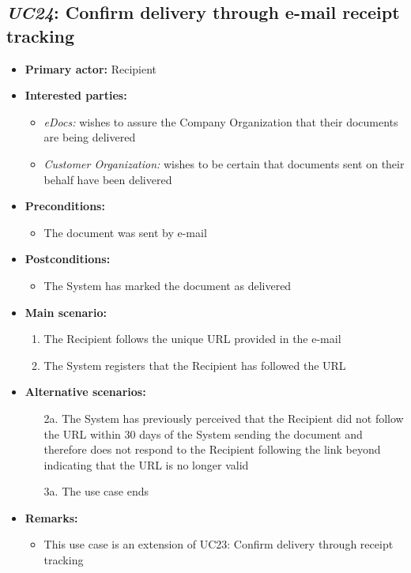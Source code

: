 \documentclass[a4paper,10pt]{article}
\begin{document}
\subsection{\emph{UC24}: Confirm delivery through e-mail receipt tracking}
\begin{itemize}
	\item \textbf{Primary actor:} Recipient
	\item \textbf{Interested parties:} 
	\begin{itemize}
		\item \textit{eDocs:} wishes to assure the Company Organization that their documents are being delivered
		\item \textit{Customer Organization:} wishes to be certain that documents sent on their behalf have been delivered
	\end{itemize}
	
	\item \textbf{Preconditions:}
	\begin{itemize}
		\item The document was sent by e-mail
	\end{itemize}
	
	\item \textbf{Postconditions:}
	\begin{itemize}
		\item The System has marked the document as delivered
	\end{itemize}
	
	\item \textbf{Main scenario:} 
	\begin{enumerate}
		\item The Recipient follows the unique URL provided in the e-mail
		\item The System registers that the Recipient has followed the URL
	\end{enumerate}
	
	\item \textbf{Alternative scenarios:} 
	\begin{enumerate}
		\item [2a.] The System has previously perceived that the Recipient did not follow the URL within 30 days of the System sending the document and therefore does not respond to the Recipient following the link beyond indicating that the URL is no longer valid
		\item [3a.] The use case ends
	\end{enumerate}
	
	\item \textbf{Remarks:}
	\begin{itemize}
		\item This use case is an extension of UC23: Confirm delivery through receipt tracking
	\end{itemize}
\end{itemize}
\end{document}
